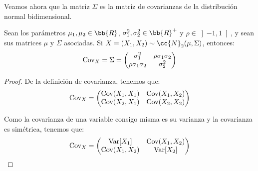 Veamos ahora que la matriz $\Sigma$ es la matriz de covarianzas de la distribución normal bidimensional.
\begin{prop}
    Sean los parámetros $\mu_1, \mu_2\in \bb{R}$, $\sigma_1^2, \sigma_2^2\in \bb{R}^+$ y $\rho\in \left]-1,1\right[$, y sean sus matrices $\mu$ y $\Sigma$ asociadas.
    Si $X=(X_1, X_2)\sim \cc{N}_2(\mu, \Sigma)$, entonces:
    \begin{equation*}
        \operatorname{Cov}_X=\Sigma = \begin{pmatrix}
            \sigma_1^2 & \rho\sigma_1\sigma_2\\
            \rho\sigma_1\sigma_2 & \sigma_2^2
        \end{pmatrix}
    \end{equation*}
\end{prop}
\begin{proof}
    De la definición de covarianza, tenemos que:
    \begin{equation*}
        \operatorname{Cov}_X=\begin{pmatrix}
            \operatorname{Cov}(X_1, X_1) & \operatorname{Cov}(X_1, X_2)\\
            \operatorname{Cov}(X_2, X_1) & \operatorname{Cov}(X_2, X_2)
        \end{pmatrix}
    \end{equation*}

    Como la covarianza de una variable consigo misma es su varianza y la covarianza es simétrica, tenemos que:
    \begin{equation*}
        \operatorname{Cov}_X=\begin{pmatrix}
            \operatorname{Var}[X_1] & \operatorname{Cov}(X_1, X_2)\\
            \operatorname{Cov}(X_1, X_2) & \operatorname{Var}[X_2]
        \end{pmatrix}
    \end{equation*}


\end{proof}
